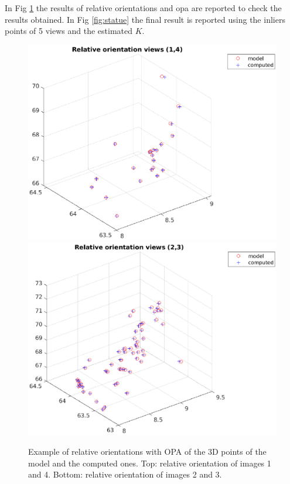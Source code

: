 \documentclass[12pt]{article}
\begin{document}
\bigskip
In Fig \ref{fig:relative} the results of relative orientations and opa are reported to check the results obtained. In Fig \ref{fig:statue} the final result is reported using the inliers points of 5 views and the estimated $K$.
\begin{figure}[H]
    \centering
    \includegraphics[scale=0.65]{images/relative_3.eps}
    \qquad
    \includegraphics[scale=0.65]{images/relative_4.eps}
    \caption{Example of relative orientations with OPA of the 3D points of the model and the computed ones. Top: relative orientation of images 1 and 4. Bottom: relative orientation of images 2 and 3.}
    \label{fig:relative}
\end{figure}
\end{document}
